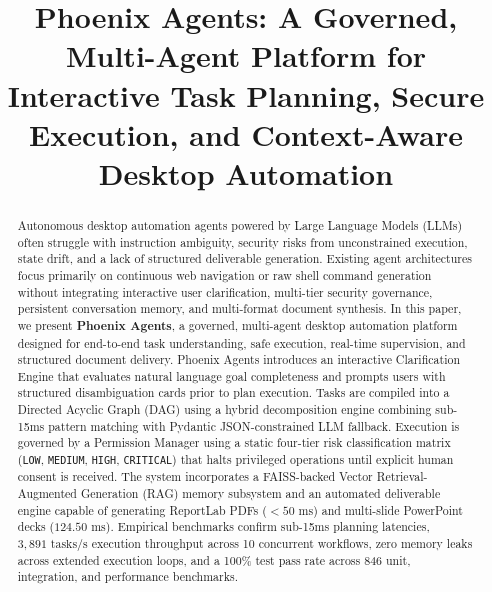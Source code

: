 \documentclass[conference]{IEEEtran}
\begin{document}
\title{Phoenix Agents: A Governed, Multi-Agent Platform for Interactive Task Planning, Secure Execution, and Context-Aware Desktop Automation}

\author{
}

\maketitle

\begin{abstract}
Autonomous desktop automation agents powered by Large Language Models (LLMs) often struggle with instruction ambiguity, security risks from unconstrained execution, state drift, and a lack of structured deliverable generation. Existing agent architectures focus primarily on continuous web navigation or raw shell command generation without integrating interactive user clarification, multi-tier security governance, persistent conversation memory, and multi-format document synthesis. In this paper, we present \textbf{Phoenix Agents}, a governed, multi-agent desktop automation platform designed for end-to-end task understanding, safe execution, real-time supervision, and structured document delivery. Phoenix Agents introduces an interactive Clarification Engine that evaluates natural language goal completeness and prompts users with structured disambiguation cards prior to plan execution. Tasks are compiled into a Directed Acyclic Graph (DAG) using a hybrid decomposition engine combining sub-15ms pattern matching with Pydantic JSON-constrained LLM fallback. Execution is governed by a Permission Manager using a static four-tier risk classification matrix (\texttt{LOW}, \texttt{MEDIUM}, \texttt{HIGH}, \texttt{CRITICAL}) that halts privileged operations until explicit human consent is received. The system incorporates a FAISS-backed Vector Retrieval-Augmented Generation (RAG) memory subsystem and an automated deliverable engine capable of generating ReportLab PDFs ($<50\text{ ms}$) and multi-slide PowerPoint decks ($124.50\text{ ms}$). Empirical benchmarks confirm sub-15ms planning latencies, $3,891\text{ tasks/s}$ execution throughput across 10 concurrent workflows, zero memory leaks across extended execution loops, and a 100\% test pass rate across 846 unit, integration, and performance benchmarks.
\end{abstract}
\end{document}

